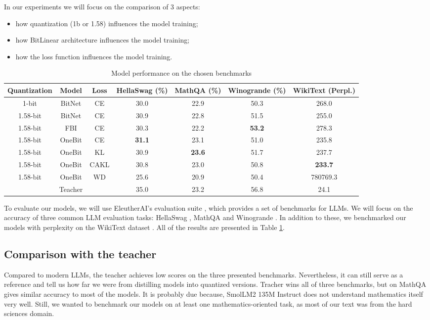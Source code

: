 \documentclass{article}
\begin{document}
In our experiments we will focus on the comparison of 3 aspects:

\begin{itemize}
    \item how quantization (1b or 1.58) influences the model training;
    \item how BitLinear architecture influences the model training;
    \item how the loss function influences the model training.
\end{itemize}



\begin{table}[ht]
  \centering
  \begin{tabular}{ccccccc}
    \toprule
    Quantization & Model & Loss & HellaSwag (\%) & MathQA (\%)  & Winogrande (\%) & WikiText (Perpl.) \\
    \midrule
    1-bit & BitNet & CE & 30.0 & 22.9 & 50.3 & 268.0 \\
    1.58-bit & BitNet & CE & 30.9 & 22.8 & 51.5 & 255.0 \\
    1.58-bit & FBI & CE& 30.3 & 22.2 & \textbf{53.2} & 278.3 \\
    1.58-bit & OneBit &  CE & \textbf{31.1} & 23.1 & 51.0 & 235.8 \\
    1.58-bit & OneBit & KL & 30.9 & \textbf{23.6} & 51.7 & 237.7 \\
    1.58-bit & OneBit & CAKL & 30.8 & 23.0 & 50.8 & \textbf{233.7} \\
    1.58-bit & OneBit & WD & 25.6 & 20.9 & 50.4 & 780769.3 \\
    \midrule
    &Teacher && 35.0 & 23.2 & 56.8  & 24.1 \\ 
    \bottomrule
  \end{tabular}
  \vspace{0.5em}
  \caption{Model performance on the chosen benchmarks}
  \label{table:bchmrk}
\end{table}


To evaluate our models, we will use EleutherAI's evaluation suite \cite{eval-harness}, which provides a set of benchmarks for LLMs. We will focus on the accuracy of three common LLM evaluation tasks: HellaSwag \cite{zellers2019hellaswag}, MathQA \cite{amini2019mathqa} and Winogrande \cite{sakaguchi2019winogrande}. In addition to these, we benchmarked our models with perplexity on the WikiText dataset \cite{merity2016pointer}. All of the results are presented in Table \ref{table:bchmrk}.

\subsection{Comparison with the teacher}
Compared to modern LLMs, the teacher achieves low scores on the three presented benchmarks. Nevertheless, it can still serve as a reference and tell us how far we were from distilling models into quantized versions. Tracher wins all of three benchmarks, but on MathQA gives similar accuracy to most of the models. It is probably due because, SmolLM2 135M Instruct does not understand mathematics itself very well. Still, we wanted to benchmark our models on at least one mathematics-oriented task, as most of our text was from the hard sciences domain.
\end{document}
